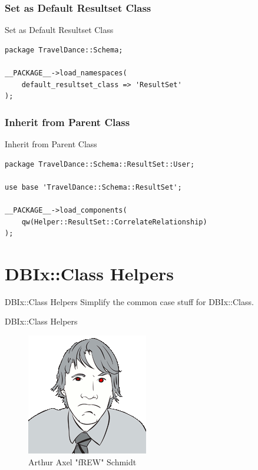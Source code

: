 \subsubsection{Set as Default Resultset Class}

\begin{frame}[fragile]{Set as Default Resultset Class}
\begin{lstlisting}
package TravelDance::Schema;

__PACKAGE__->load_namespaces(
    default_resultset_class => 'ResultSet'
);

\end{lstlisting}
\end{frame}

\subsubsection{Inherit from Parent Class}
\begin{frame}[fragile]{Inherit from Parent Class}
\begin{lstlisting}
package TravelDance::Schema::ResultSet::User;

use base 'TravelDance::Schema::ResultSet';

__PACKAGE__->load_components(
    qw(Helper::ResultSet::CorrelateRelationship)
);
\end{lstlisting}
\end{frame}

\section{DBIx::Class Helpers}

\begin{frame}{DBIx::Class Helpers}
Simplify the common case stuff for DBIx::Class.
\end{frame}

\begin{frame}{DBIx::Class Helpers}
\begin{figure}[!ht]
\centering
\includegraphics[width=0.4\linewidth]{img/frew.png}
\caption{Arthur Axel "fREW" Schmidt}
\end{figure}
\end{frame}

